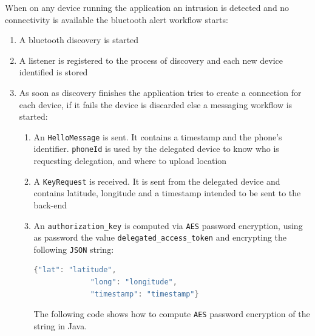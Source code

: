 \documentclass[conference]{IEEEtran}
\begin{document}
When on any device running the application an intrusion is detected and no connectivity is available the bluetooth alert workflow starts:\\
\begin{enumerate}
	\item A bluetooth discovery is started
	\item A listener is registered to the process of discovery and each new device identified is stored
	\item As soon as discovery finishes the application tries to create a connection for each device, if it fails the device is discarded else a messaging workflow is started:
		\begin{enumerate}

			\item An \texttt{HelloMessage} is sent. It contains a timestamp and the phone's identifier. \texttt{phoneId} is used by the delegated device to know who is requesting delegation, and where to upload location
			\item A \texttt{KeyRequest} is received. It is sent from the delegated device and contains latitude, longitude and a timestamp intended to be sent to the back-end
			\item An \texttt{authorization\_key} is computed via \texttt{AES} password encryption, using as password the value \texttt{delegated\_access\_token} and encrypting the following \texttt{JSON} string:

			\begin{lstlisting}[language=Java, caption=JSON encrypted with AES]
			{"lat": "latitude",
			 "long": "longitude",
			 "timestamp": "timestamp"}
			\end{lstlisting}

			The following code shows how to compute \texttt{AES} password encryption of the string in Java.


\end{enumerate}
\end{enumerate}
\end{document}
